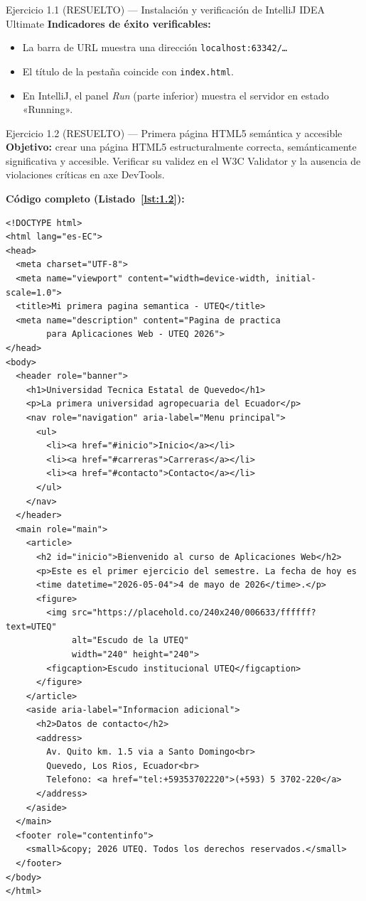 \documentclass[11pt,a4paper,openany]{book}
\begin{document}
\begin{cajaejercicio}{Ejercicio 1.1 (RESUELTO) --- Instalación y verificación de IntelliJ IDEA Ultimate}
\textbf{Indicadores de éxito verificables:}
\begin{itemize}
\item La barra de URL muestra una dirección \texttt{localhost:63342/\dots}
\item El título de la pestaña coincide con \texttt{index.html}.
\item En IntelliJ, el panel \emph{Run} (parte inferior) muestra el
servidor en estado «Running».
\end{itemize}
\end{cajaejercicio}

\begin{cajaejercicio}{Ejercicio 1.2 (RESUELTO) --- Primera página HTML5 semántica y accesible}
\textbf{Objetivo:} crear una página HTML5 estructuralmente correcta,
semánticamente significativa y accesible. Verificar su validez en el
W3C Validator y la ausencia de violaciones críticas en axe DevTools.

\textbf{Código completo (Listado~\ref{lst:1.2}):}

\begin{lstlisting}[style=html,caption={index.html (Ejercicio 1.2)},label=lst:1.2]
<!DOCTYPE html>
<html lang="es-EC">
<head>
  <meta charset="UTF-8">
  <meta name="viewport" content="width=device-width, initial-scale=1.0">
  <title>Mi primera pagina semantica - UTEQ</title>
  <meta name="description" content="Pagina de practica
        para Aplicaciones Web - UTEQ 2026">
</head>
<body>
  <header role="banner">
    <h1>Universidad Tecnica Estatal de Quevedo</h1>
    <p>La primera universidad agropecuaria del Ecuador</p>
    <nav role="navigation" aria-label="Menu principal">
      <ul>
        <li><a href="#inicio">Inicio</a></li>
        <li><a href="#carreras">Carreras</a></li>
        <li><a href="#contacto">Contacto</a></li>
      </ul>
    </nav>
  </header>
  <main role="main">
    <article>
      <h2 id="inicio">Bienvenido al curso de Aplicaciones Web</h2>
      <p>Este es el primer ejercicio del semestre. La fecha de hoy es
      <time datetime="2026-05-04">4 de mayo de 2026</time>.</p>
      <figure>
        <img src="https://placehold.co/240x240/006633/ffffff?text=UTEQ"
             alt="Escudo de la UTEQ"
             width="240" height="240">
        <figcaption>Escudo institucional UTEQ</figcaption>
      </figure>
    </article>
    <aside aria-label="Informacion adicional">
      <h2>Datos de contacto</h2>
      <address>
        Av. Quito km. 1.5 via a Santo Domingo<br>
        Quevedo, Los Rios, Ecuador<br>
        Telefono: <a href="tel:+59353702220">(+593) 5 3702-220</a>
      </address>
    </aside>
  </main>
  <footer role="contentinfo">
    <small>&copy; 2026 UTEQ. Todos los derechos reservados.</small>
  </footer>
</body>
</html>
\end{lstlisting}


\end{cajaejercicio}
\end{document}
